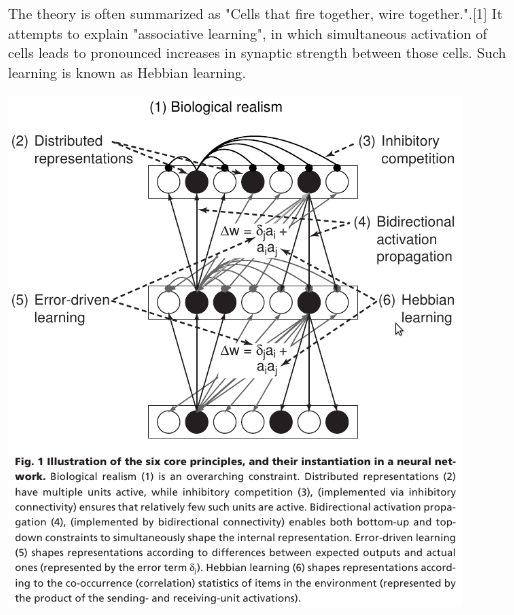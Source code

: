 The theory is often summarized as "Cells that fire together, wire together.".[1] It attempts to explain "associative learning", in which simultaneous activation of cells leads to pronounced increases in synaptic strength between those cells. Such learning is known as Hebbian learning.

\includegraphics[width=12cm]{img/bio_plausability_o1998six.png}
